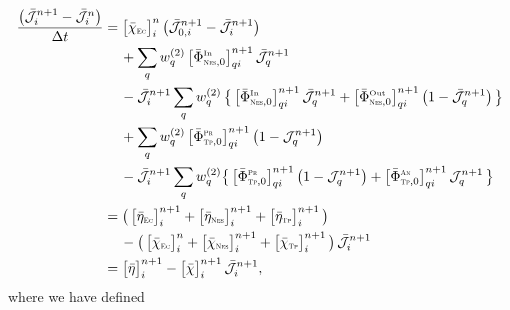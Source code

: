\documentclass[12pt]{article}
\newcommand{\EC}{\mbox{\tiny{\sc Ec}}}
\newcommand{\NES}{\mbox{\tiny{\sc Nes}}} %
\newcommand{\PROD}{\mbox{\tiny{\sc Pr}}}
\newcommand{\ANN}{\mbox{\tiny{\sc An}}}
\newcommand{\TP}{\mbox{\tiny{\sc Tp}}}      %
\begin{document}
\begin{align}
  \f{\big(\bar{\mathcal{J}}_{i}^{n+1}-\bar{\mathcal{J}}_{i}^{n}\big)}{\dt}
  &=\big[\bar{\chi}_{\EC}\big]_{i}^{n}\,\big(\bar{\mathcal{J}}_{0,i}^{n+1}-\bar{\mathcal{J}}_{i}^{n+1}\big) \nonumber \\
  &\hspace{12pt}
  +\sum_{q}w_{q}^{(2)}\,\big[\bar{\Phi}_{\NES,0}^{\In}\big]_{qi}^{n+1}\,\bar{\mathcal{J}}_{q}^{n+1} \nonumber \\
  &\hspace{12pt}
  -\bar{\mathcal{J}}_{i}^{n+1}\sum_{q}w_{q}^{(2)}\,\big\{\,\big[\bar{\Phi}_{\NES,0}^{\In}\big]_{qi}^{n+1}\,\bar{\mathcal{J}}_{q}^{n+1}+\big[\bar{\Phi}_{\NES,0}^{\Out}\big]_{qi}^{n+1}\,\big(1-\bar{\mathcal{J}}_{q}^{n+1}\big)\,\big\} \nonumber \\
  &\hspace{12pt}
  + \sum_{q}w_{q}^{(2)}\,\big[\bar{\Phi}_{\TP,0}^{\PROD}\big]_{qi}^{n+1}\,\big(1-\mathcal{J}_{q}^{n+1}\big) \nonumber \\
  &\hspace{12pt}
  -\bar{\mathcal{J}}_{i}^{n+1}\sum_{q}w_{q}^{(2)}\big\{\,\big[\bar{\Phi}_{\TP,0}^{\PROD}\big]_{qi}^{n+1}\,\big(1-\mathcal{J}_{q}^{n+1}\big)+\big[\bar{\Phi}_{\TP,0}^{\ANN}\big]_{qi}^{n+1}\,\mathcal{J}_{q}^{n+1}\,\big\} \nonumber \\
  &=\big(\,\big[\bar{\eta}_{\EC}\big]_{i}^{n+1}+\big[\bar{\eta}_{\NES}\big]_{i}^{n+1}+\big[\bar{\eta}_{\TP}\big]_{i}^{n+1}\,\big) \nonumber \\
  &\hspace{12pt}
  -\big(\,\big[\bar{\chi}_{\EC}\big]_{i}^{n}+\big[\bar{\chi}_{\NES}\big]_{i}^{n+1}+\big[\bar{\chi}_{\TP}\big]_{i}^{n+1}\,\big)\,\bar{\mathcal{J}}_{i}^{n+1} \nonumber \\
  &=\big[\bar{\eta}\big]_{i}^{n+1} - \big[\bar{\chi}\big]_{i}^{n+1}\,\bar{\mathcal{J}}_{i}^{n+1},
  \label{eq:antineutrinoDiscrete}
\end{align}
where we have defined
\end{document}
